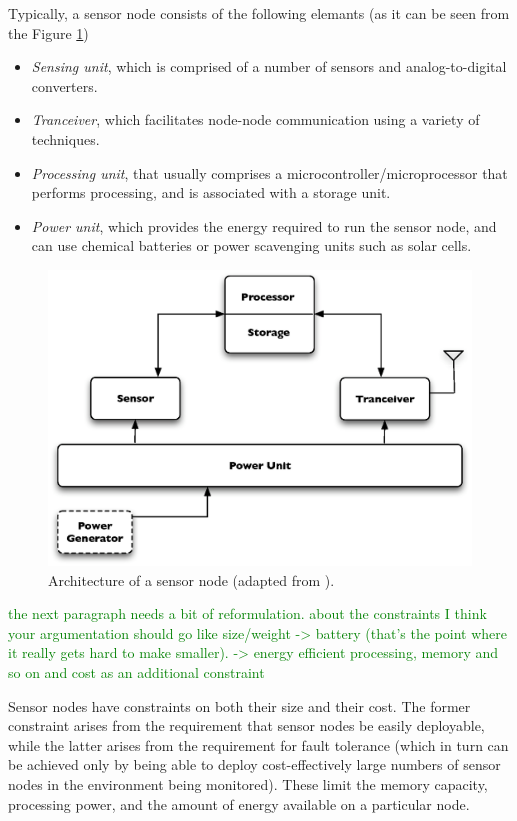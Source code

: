 Typically, a sensor node consists of the following elemants (as it can be seen
from the Figure \ref{Fig:SensorNodeArch})
\begin{itemize}
  \item \emph{Sensing unit}, which is comprised of a number of sensors and
  analog-to-digital converters. 
  \item \emph{Tranceiver}, which facilitates node-node communication using 
a variety of techniques.
  \item \emph{Processing unit}, that usually comprises a 
microcontroller/microprocessor that performs processing, and is associated with 
a storage unit.
  \item \emph{Power unit}, which provides the energy required to run the sensor node, and can use chemical 
batteries or power scavenging units such as solar cells.
\end{itemize}


\begin{figure}
\centering
\includegraphics[scale=0.65]{img/SensorNodeArch.eps} 
\caption[Architecture of a sensor node] {Architecture of a sensor node (adapted from \cite{SensorSurveyAkyildiz:2002}).}
\label{Fig:SensorNodeArch}
\end{figure} 


\textcolor{green}{the next paragraph needs a bit of reformulation. about the constraints
I think your argumentation should go like size/weight -> battery  (that's the
point where it really gets hard to make smaller). -> energy efficient processing, memory and so on
and cost as an additional constraint }

Sensor nodes have constraints on both their size and their cost. The former 
constraint arises from the requirement that sensor nodes be easily deployable, 
while the latter arises from the requirement for fault tolerance (which in turn 
can be achieved only by being able to deploy cost-effectively large numbers of
sensor nodes in the environment being monitored). These limit the memory capacity, processing 
power, and the amount of energy available on a particular node.

